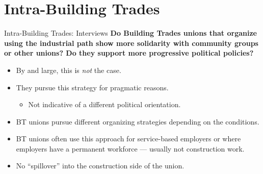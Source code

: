\documentclass{beamer}
\begin{document}
\section{Intra-Building Trades}

\begin{frame}{Intra-Building Trades: Interviews}
\textbf{Do Building Trades unions that organize using the industrial path show more solidarity with community groups or other unions? Do they support more progressive political policies?}\newline
	\begin{itemize}
		\item By and large, this is \emph{not} the case.
		\item They pursue this strategy for pragmatic reasons.
		\begin{itemize}
			\item Not indicative of a different political orientation.
		\end{itemize}
		\item BT unions pursue different organizing strategies depending on the conditions.
		\item BT unions often use this approach for service-based employers or where employers have a permanent workforce — usually not construction work.
		\item No “spillover” into the construction side of the union.
	\end{itemize}
\end{frame}



\end{document}
